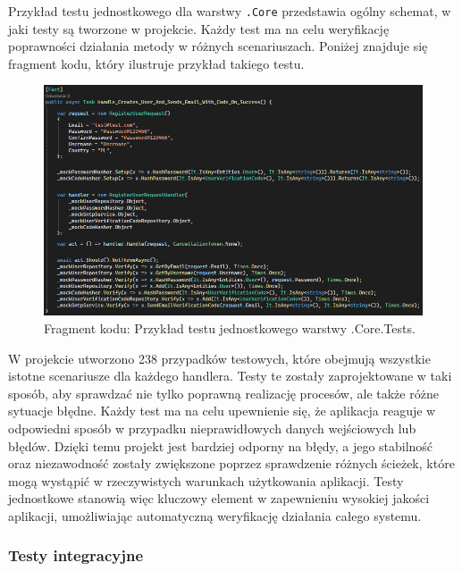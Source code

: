 \documentclass[twoside]{projektInzynierskiMS1}
\begin{document}
\newpage

\noindent
Przykład testu jednostkowego dla warstwy \texttt{.Core} przedstawia ogólny schemat, w jaki testy są tworzone w projekcie. Każdy test ma na celu weryfikację poprawności działania metody w różnych scenariuszach. Poniżej znajduje się fragment kodu, który ilustruje przykład takiego testu.

\vspace{0.5cm}
\begin{figure}[h!]
    \centering
    \includegraphics[width=1\textwidth]{images/ex_core_test.png}
    \caption{Fragment kodu: Przykład testu jednostkowego warstwy .Core.Tests.}
\end{figure}
\vspace{0.5cm}

\noindent
W projekcie utworzono 238 przypadków testowych, które obejmują wszystkie istotne scenariusze dla każdego handlera. Testy te zostały zaprojektowane w taki sposób, aby sprawdzać nie tylko poprawną realizację procesów, ale także różne sytuacje błędne. Każdy test ma na celu upewnienie się, że aplikacja reaguje w odpowiedni sposób w przypadku nieprawidłowych danych wejściowych lub błędów. Dzięki temu projekt jest bardziej odporny na błędy, a jego stabilność oraz niezawodność zostały zwiększone poprzez sprawdzenie różnych ścieżek, które mogą wystąpić w rzeczywistych warunkach użytkowania aplikacji. Testy jednostkowe stanowią więc kluczowy element w zapewnieniu wysokiej jakości aplikacji, umożliwiając automatyczną weryfikację działania całego systemu.

\newpage

\subsubsection{Testy integracyjne}
\end{document}

